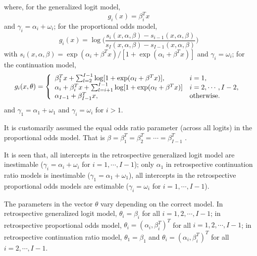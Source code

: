 \documentclass[11pt]{article}
\theoremstyle{plain}
\theoremstyle{definition}
\theoremstyle{remark}
\theoremstyle{definition}
\begin{document}
\noindent where, for the generalized logit model,
\begin{equation}
g_i(x) = \beta_i^T x \label{gfunction_GL}
\end{equation}
and $\gamma_i=\alpha_i + \omega_i$; for the proportional odds model,
\begin{equation}
g_i(x) = \log\Big(\frac{s_i(x,\alpha,\beta)-s_{i-1}(x,\alpha, \beta)}{s_I(x, \alpha, \beta)-s_{I-1}(x,\alpha, \beta)}\Big)\label{gfunctionPO}
\end{equation}
with $s_i(x, \alpha, \beta)=\exp(\alpha_i+\beta^T x)/[1+\exp(\alpha_i+\beta^T x)]$ and $\gamma_i=\omega_i$; for the continuation model,
\begin{equation}
g_i(x,\theta)=\left\{\begin{array}{lllll}
$$ \beta_1^T x+\sum_{l=2}^{I-1}\log[1+\exp(\alpha_l+\beta^T x)], & i=1, $$\\
$$\alpha_i+\beta_i^T x+\sum_{l=i+1}^{I-1}\log[1+\exp(\alpha_l+\beta^T x)] & i=2, \cdots, I-2, $$\\
$$\alpha_{I-1}+\beta_{I-1}^T x, & \mbox{otherwise}.$$
\end{array}
\right. \label{gfunction_CR}
\end{equation}
and $\gamma_1=\alpha_1 + \omega_1$ and $\gamma_i=\omega_i$ for $i >1$.

\rem It is customarily assumed the equal odds ratio parameter (across all logits) in the proportional odds model. That is $\beta=\beta^T_1= \beta^T_2=\cdots=\beta^T_{I-1}$  \citep{MCCULLAGH-OrdinalReg-Discussion-1980, ZhangBiao-AustrNZJS-2004}.

\rem It is seen that, all intercepts in the retrospective generalized logit model are inestimable ($\gamma_i=\alpha_i + \omega_i$ for $i=1, \cdots, I-1$); only $\alpha_1$ in retrospective continuation ratio models is inestimable ($\gamma_1=\alpha_1 + \omega_1$), all intercepts in the retrospective proportional odds models are estimable ($\gamma_i=\omega_i$ for $i=1, \cdots, I-1$).

\rem The parameters in the vector $\theta$ vary depending on the correct model. In retrospective generalized logit model, $\theta_i=\beta_i$ for all $i=1,2, \cdots, I-1$; in retrospective proportional odds model, $\theta_i=(\alpha_i,\beta_i^T)^T$ for all $i=1,2, \cdots, I-1$; in retrospective continuation ratio model, $\theta_1 = \beta_1$ and $\theta_i=(\alpha_i,\beta_i^T)^T$ for all $i=2, \cdots, I-1$. \label{model_parametrization}
\end{document}
